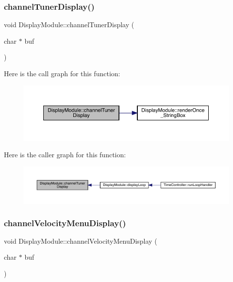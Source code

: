 \subsubsection{\texorpdfstring{channel\+Tuner\+Display()}{channelTunerDisplay()}}
{\footnotesize\ttfamily void Display\+Module\+::channel\+Tuner\+Display (\begin{DoxyParamCaption}\item[{char $\ast$}]{buf }\end{DoxyParamCaption})}

Here is the call graph for this function\+:
\nopagebreak
\begin{figure}[H]
\begin{center}
\leavevmode
\includegraphics[width=350pt]{class_display_module_a579629d520ad24f721a25b9b1340516b_cgraph}
\end{center}
\end{figure}
Here is the caller graph for this function\+:
\nopagebreak
\begin{figure}[H]
\begin{center}
\leavevmode
\includegraphics[width=350pt]{class_display_module_a579629d520ad24f721a25b9b1340516b_icgraph}
\end{center}
\end{figure}
\mbox{\label{class_display_module_afb4cbf31bb1058fdeceb3d10ae7fe3a6}} 
\subsubsection{\texorpdfstring{channel\+Velocity\+Menu\+Display()}{channelVelocityMenuDisplay()}}
{\footnotesize\ttfamily void Display\+Module\+::channel\+Velocity\+Menu\+Display (\begin{DoxyParamCaption}\item[{char $\ast$}]{buf }\end{DoxyParamCaption})}

